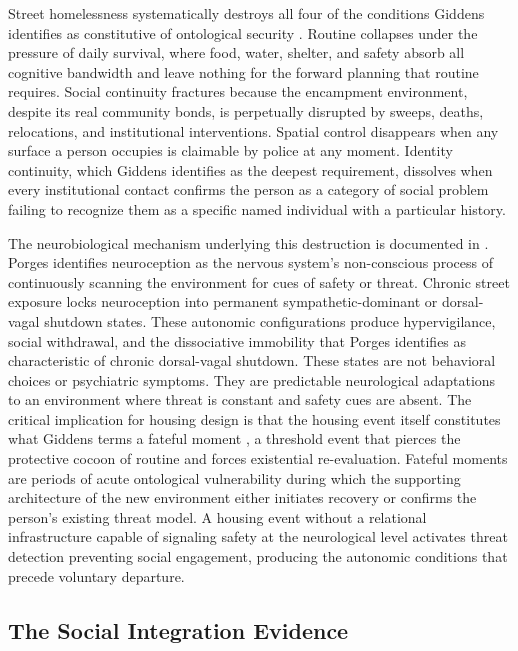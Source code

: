 \documentclass[12pt, letterpaper]{article}
\begin{document}
Street homelessness systematically destroys all four of the conditions Giddens identifies as constitutive of ontological security \citep{giddens_1991}. Routine collapses under the pressure of daily survival, where food, water, shelter, and safety absorb all cognitive bandwidth and leave nothing for the forward planning that routine requires. Social continuity fractures because the encampment environment, despite its real community bonds, is perpetually disrupted by sweeps, deaths, relocations, and institutional interventions. Spatial control disappears when any surface a person occupies is claimable by police at any moment. Identity continuity, which Giddens identifies as the deepest requirement, dissolves when every institutional contact confirms the person as a category of social problem failing to recognize them as a specific named individual with a particular history.

The neurobiological mechanism underlying this destruction is documented in \citet{porges_2011}. Porges identifies neuroception as the nervous system's non-conscious process of continuously scanning the environment for cues of safety or threat. Chronic street exposure locks neuroception into permanent sympathetic-dominant or dorsal-vagal shutdown states. These autonomic configurations produce hypervigilance, social withdrawal, and the dissociative immobility that Porges identifies as characteristic of chronic dorsal-vagal shutdown. These states are not behavioral choices or psychiatric symptoms. They are predictable neurological adaptations to an environment where threat is constant and safety cues are absent. The critical implication for housing design is that the housing event itself constitutes what Giddens terms a fateful moment \citep{giddens_1991}, a threshold event that pierces the protective cocoon of routine and forces existential re-evaluation. Fateful moments are periods of acute ontological vulnerability during which the supporting architecture of the new environment either initiates recovery or confirms the person's existing threat model. A housing event without a relational infrastructure capable of signaling safety at the neurological level activates threat detection preventing social engagement, producing the autonomic conditions that precede voluntary departure.

\subsection{The Social Integration Evidence}
\end{document}
